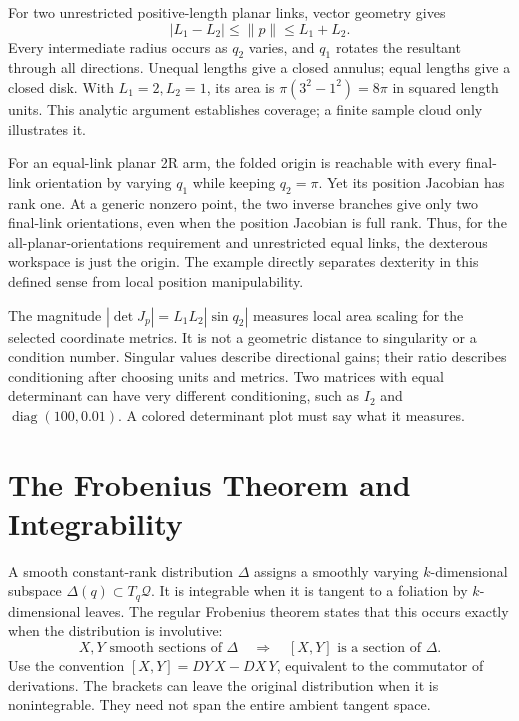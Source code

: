 For two unrestricted positive-length planar links, vector geometry gives
\begin{equation}
 |L_1-L_2|\le\|p\|\le L_1+L_2.
\end{equation}
Every intermediate radius occurs as $q_2$ varies, and $q_1$ rotates the resultant through all directions. Unequal lengths give a closed annulus; equal lengths give a closed disk. With $L_1=2,L_2=1$, its area is $\pi(3^2-1^2)=8\pi$ in squared length units. This analytic argument establishes coverage; a finite sample cloud only illustrates it.

For an equal-link planar 2R arm, the folded origin is reachable with every final-link orientation by varying $q_1$ while keeping $q_2=\pi$. Yet its position Jacobian has rank one. At a generic nonzero point, the two inverse branches give only two final-link orientations, even when the position Jacobian is full rank. Thus, for the all-planar-orientations requirement and unrestricted equal links, the dexterous workspace is just the origin. The example directly separates dexterity in this defined sense from local position manipulability.

The magnitude $|\det J_p|=L_1L_2|\sin q_2|$ measures local area scaling for the selected coordinate metrics. It is not a geometric distance to singularity or a condition number. Singular values describe directional gains; their ratio describes conditioning after choosing units and metrics. Two matrices with equal determinant can have very different conditioning, such as $I_2$ and $\operatorname{diag}(100,0.01)$. A colored determinant plot must say what it measures.

\section{The Frobenius Theorem and Integrability}
\label{sec:frobenius}
\label{laymans:laymans_frobenius}
\label{ex:rod_frobenius}
\label{ex:car_frobenius}
\label{thm:frobenius}
\label{def:smooth_distribution}

A smooth constant-rank distribution $\Delta$ assigns a smoothly varying $k$-dimensional subspace $\Delta(q)\subset T_q\mathcal Q$. It is integrable when it is tangent to a foliation by $k$-dimensional leaves. The regular Frobenius theorem states that this occurs exactly when the distribution is involutive:
\begin{equation}
 X,Y\text{ smooth sections of }\Delta
 \quad\Longrightarrow\quad[X,Y]\text{ is a section of }\Delta.
 \label{eq:frobenius_condition}
\end{equation}
Use the convention $[X,Y]=DY\,X-DX\,Y$, equivalent to the commutator of derivations. The brackets can leave the original distribution when it is nonintegrable. They need not span the entire ambient tangent space.

